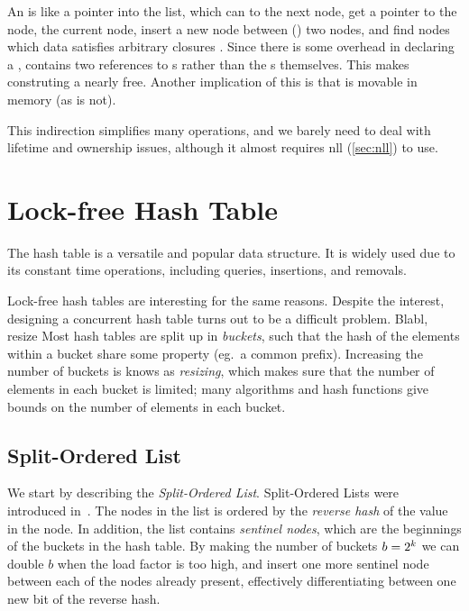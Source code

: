 \begin{figure}[ht]

\end{figure}

An  is like a pointer into the list, which can  to the next node, get a
pointer to the  node,  the current node, insert a new node between
() two nodes, and find nodes which data satisfies arbitrary closures
.  Since there is some overhead in declaring a , 
contains two references to s rather than the s themselves. This makes
construting a  nearly free.  Another implication of this is that  is
movable in memory (as  is not).

This indirection simplifies many operations, and we barely need to deal with lifetime and ownership
issues, although it almost requires \gls{nll} (\cref{sec:nll}) to use.

\begin{figure}[ht]

\end{figure}







\section{Lock-free Hash Table}

The hash table is a versatile and popular data structure. It is widely used due to its constant time
operations, including queries, insertions, and removals.

Lock-free hash tables are interesting for the same reasons. Despite the interest, designing a
concurrent hash table turns out to be a difficult problem. Blabl, resize
Most hash tables are split up in \emph{buckets}, such that the hash of the elements within a bucket
share some property (eg.\ a common prefix). Increasing the number of buckets is knows as
\emph{resizing}, which makes sure that the number of elements in each bucket is limited; many
algorithms and hash functions give bounds on the number of elements in each bucket.

\subsection{Split-Ordered List}

We start by describing the \emph{Split-Ordered List}. Split-Ordered Lists were introduced
in~\cite{shalev2006split}. The nodes in the list is ordered by the \emph{reverse hash} of the value
in the node. In addition, the list contains \emph{sentinel nodes}, which are the beginnings of the
buckets in the hash table. By making the number of buckets $b=2\sp{k}$ we can double $b$ when the
load factor is too high, and insert one more sentinel node between each of the nodes already
present, effectively differentiating between one new bit of the reverse hash.

